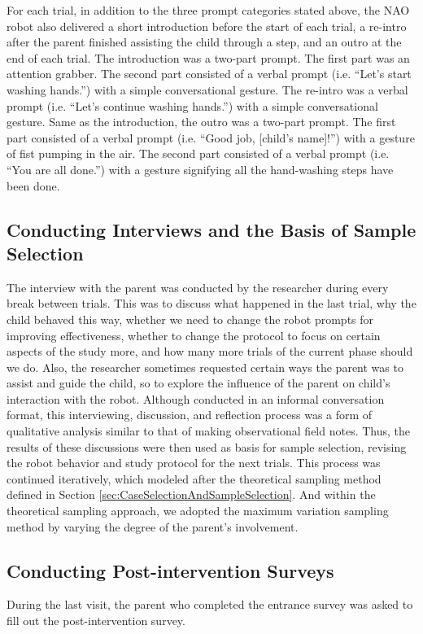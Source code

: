 For each trial, in addition to the three prompt categories stated above, the NAO robot also delivered a short introduction before the start of each trial, a re-intro after the parent finished assisting the child through a step, and an outro at the end of each trial. The introduction was a two-part prompt. The first part was an attention grabber. The second part consisted of a verbal prompt (i.e. “Let's start washing hands.”) with a simple conversational gesture. The re-intro was a verbal prompt (i.e. “Let's continue washing hands.”) with a simple conversational gesture. Same as the introduction, the outro was a two-part prompt. The first part consisted of a verbal prompt (i.e. “Good job, [child's name]!”) with a gesture of fist pumping in the air. The second part consisted of a verbal prompt (i.e. “You are all done.”) with a gesture signifying all the hand-washing steps have been done.

\subsection{Conducting Interviews and the Basis of Sample Selection}
\label{sec:ConductingInterviews}
The interview with the parent was conducted by the researcher during every break between trials.  This was to discuss what happened in the last trial, why the child behaved this way, whether we need to change the robot prompts for improving effectiveness, whether to change the protocol to focus on certain aspects of the study more, and how many more trials of the current phase should we do.  Also, the researcher sometimes requested certain ways the parent was to assist and guide the child, so to explore the influence of the parent on child's interaction with the robot.  Although conducted in an informal conversation format, this interviewing, discussion, and reflection process was a form of qualitative analysis similar to that of making observational field notes.  Thus, the results of these discussions were then used as basis for sample selection, revising the robot behavior and study protocol for the next trials.  This process was continued iteratively, which modeled after the theoretical sampling method defined in Section \ref{sec:CaseSelectionAndSampleSelection}.  And within the theoretical sampling approach, we adopted the maximum variation sampling method by varying the degree of the parent's involvement.

\subsection{Conducting Post-intervention Surveys}
During the last visit, the parent who completed the entrance survey was asked to fill out the post-intervention survey.

